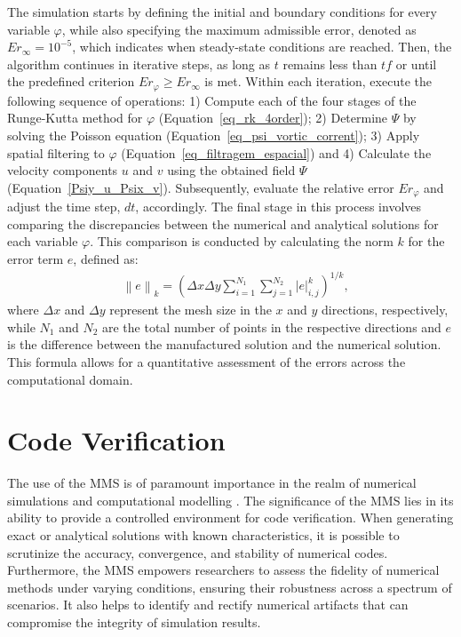 \documentclass[preprint, 12pt]{elsarticle}
\begin{document}
The simulation starts by defining the initial and boundary conditions for every variable $\varphi$, while also specifying the maximum admissible error, denoted as $Er_{\infty} = 10^{-5}$, which indicates when steady-state conditions are reached. Then, the algorithm continues in iterative steps, as long as $t$ remains less than $tf$ or until the predefined criterion $Er_{\varphi} \geq Er_{\infty}$ is met. Within each iteration, execute the following sequence of operations: 1) Compute each of the four stages of the Runge-Kutta method for $\varphi$ (Equation~\eqref{eq_rk_4order}); 2) Determine $\Psi$ by solving the Poisson equation (Equation~\eqref{eq_psi_vortic_corrent}); 3) Apply spatial filtering to $\varphi$ (Equation~\eqref{eq_filtragem_espacial}) and 4) Calculate the velocity components $u$ and $v$ using the obtained field $\Psi$ (Equation~\eqref{Psiy_u_Psix_v}). Subsequently, evaluate the relative error $Er_{\varphi}$ and adjust the time step, $dt$, accordingly. The final stage in this process involves comparing the discrepancies between the numerical and analytical solutions for each variable $\varphi$. This comparison is conducted by calculating the norm $k$ for the error term $e$, defined as:
\begin{align}
    &\left \|e\right \|_{k}=\left(\Delta x \Delta y \sum_{i=1}^{N_{1}}\sum_{j=1}^{N_{2}} \left |e\right |_{i,j}^{k}\right)^{1/k}, \label{norm_k}
\end{align}
where $\Delta x$ and $\Delta y$ represent the mesh size in the $x$ and $y$ directions, respectively, while $N_{1}$ and $N_{2}$ are the total number of points in the respective directions and $e$ is the difference between the manufactured solution and the numerical solution. This formula allows for a quantitative assessment of the errors across the computational domain.

\section{Code Verification}\label{sec_CodeVerification}

The use of the MMS is of paramount importance in the realm of numerical simulations and computational modelling \cite{Roy2004, Roy2001, Roache2002}. The significance of the MMS lies in its ability to provide a controlled environment for code verification. When generating exact or analytical solutions with known characteristics, it is possible to scrutinize the accuracy, convergence, and stability of numerical codes. Furthermore, the MMS empowers researchers to assess the fidelity of numerical methods under varying conditions, ensuring their robustness across a spectrum of scenarios. It also helps to identify and rectify numerical artifacts that can compromise the integrity of simulation results.
\end{document}

